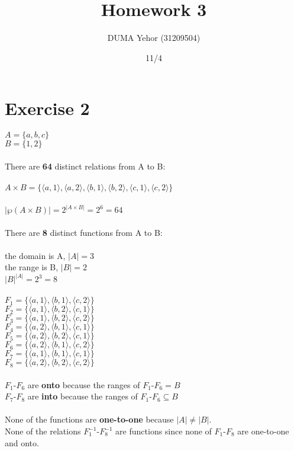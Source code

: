 \documentclass{article}
\title{Homework 3}
\author{DUMA Yehor (31209504)}
\date{11/4}
\begin{document}
\maketitle

\section{Exercise 2}
$A = \{a,b,c\}$ \\
$B = \{1,2\}$ \\ \\
There are \textbf{64} distinct relations from A to B: \\ \\
$A \times B = \{\langle a,1 \rangle, \langle a,2 \rangle, \langle b,1 \rangle, \langle b,2 \rangle, \langle c,1 \rangle, \langle c,2\rangle\}$ \\ \\
$|\wp  (A \times B)| = 2 ^{ |A \times B|} = 2^6 = 64$ \\ \\ 
There are \textbf{8} distinct functions from A to B: \\ \\ 
the domain is A, $|A|=3$ \\ 
the range is B, $|B|= 2$ \\
$|B|^{|A|}= 2^3=8$ \\ \\
$F_1=\{\langle a,1 \rangle, \langle b,1 \rangle, \langle c,2 \rangle \}$ \\
$F_2=\{\langle a,1 \rangle, \langle b,2 \rangle, \langle c,1 \rangle \}$ \\
$F_3=\{\langle a,1 \rangle, \langle b,2 \rangle, \langle c,2 \rangle \}$ \\
$F_4=\{\langle a,2 \rangle, \langle b,1 \rangle, \langle c,1 \rangle \}$ \\
$F_5=\{\langle a,2 \rangle, \langle b,2 \rangle, \langle c,1 \rangle \}$ \\
$F_6=\{\langle a,2 \rangle, \langle b,1 \rangle, \langle c,2 \rangle \}$ \\
$F_7=\{\langle a,1 \rangle, \langle b,1 \rangle, \langle c,1 \rangle \}$ \\
$F_8=\{\langle a,2 \rangle, \langle b,2 \rangle, \langle c,2 \rangle \}$ \\ \\
$F_1$-$F_6$ are \textbf{onto} because the ranges of $F_1$-$F_6 = B$ \\
$F_7$-$F_8$ are \textbf{into} because the ranges of $F_1$-$F_6 \subseteq  B$ \\ \\ 
None of the functions are \textbf{one-to-one} because $|A| \neq |B|$. \\
None of the relations $F^{-1}_{1}$-$F^{-1}_{8}$ are functions since none of $F_1$-$F_8$ are one-to-one and onto.
\end{document}
